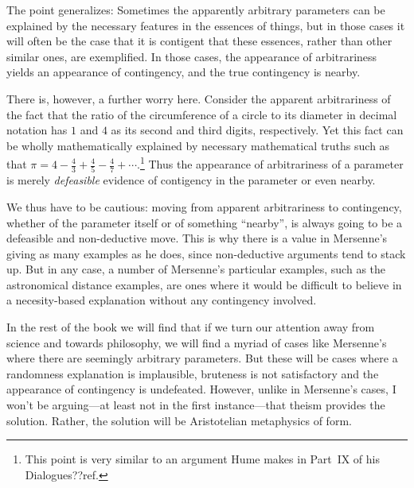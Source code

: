 The point generalizes: Sometimes the apparently arbitrary parameters can be explained by the necessary features in the essences of
things, but in those cases it will often be the case that it is contigent that these essences, rather than other similar ones, are
exemplified. In those cases, the appearance of arbitrariness yields an appearance of contingency, and the true contingency is 
nearby.

There is, however, a further worry here. Consider the apparent arbitrariness of the fact that the ratio of the circumference of
a circle to its diameter in decimal notation has $1$ and $4$ as its second and third digits, respectively. Yet this fact can 
be wholly mathematically explained by necessary mathematical truths such as that $\pi=4-\frac43+\frac45-\frac47+\cdots$.\footnote{This 
point is very similar to an argument Hume makes in Part~IX of his Dialogues??ref.} Thus the appearance of arbitrariness of a parameter is merely
\textit{defeasible} evidence of contigency in the parameter or even nearby. 

We thus have to be cautious: moving from apparent arbitrariness to contingency, whether of the parameter itself or of something ``nearby'', is
always going to be a defeasible and non-deductive move. This is why there is a value in Mersenne's giving as many examples as he does, since 
non-deductive arguments tend to stack up. But in any case, a number of Mersenne's particular examples, such as the astronomical distance examples, 
are ones where it would be difficult to believe in a necesity-based explanation without any contingency involved. 

In the rest of the book we will find that if we turn our attention away from science and towards philosophy, we will
find a myriad of cases like Mersenne's where there are seemingly arbitrary parameters. But these will be cases where
a randomness explanation is implausible, bruteness is not satisfactory and the appearance of contingency is undefeated. However, 
unlike in Mersenne's cases, I won't be arguing---at least not in the first instance---that theism provides the solution. Rather, the 
solution will be Aristotelian metaphysics of form.
\chaptertail 


